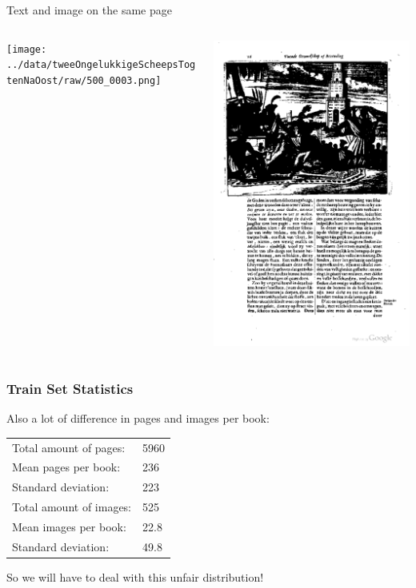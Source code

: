 {
	Text and image on the same page
	\begin{columns}
		\begin{column}{.5\textwidth}
			\texttt{[image: ../data/tweeOngelukkigeScheepsTogtenNaOost/raw/500\_0003.png]}
		\end{column}
		\begin{column}{.5\textwidth}
			\includegraphics[width=.9\columnwidth]{resources/text_and_image_example}
		\end{column}
	\end{columns}
}

\begin{frame}
\frametitle{Train Set Statistics}

Also a lot of difference in pages and images per book:

\begin{center}
\begin{tabular}{l l}
Total amount of pages: & 5960 \\
Mean pages per book: & 236 \\
Standard deviation: & 223 \\
\hline
Total amount of images: & 525 \\
Mean images per book: & 22.8 \\
Standard deviation: & 49.8
\end{tabular}
\end{center}

So we will have to deal with this unfair distribution!

\end{frame}

